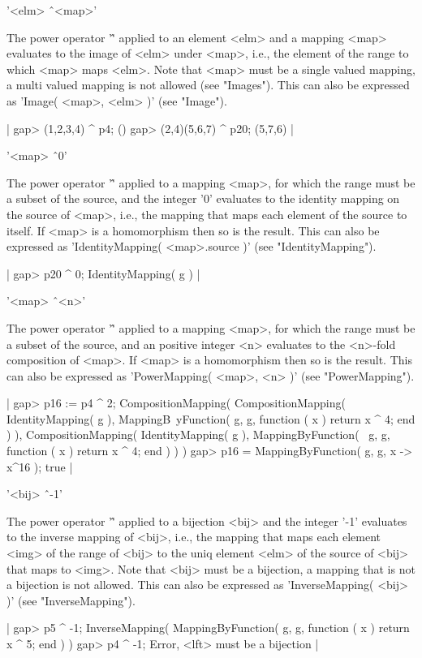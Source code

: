 '<elm> \^\ <map>'

The  power operator '\^' applied to an element <elm> and  a mapping <map>
evaluates to  the  image of <elm> under <map>,  i.e., the element  of the
range to which <map> maps <elm>.  Note that <map> must be a single valued
mapping, a multi valued mapping is not allowed (see "Images").  This  can
also be expressed as 'Image( <map>, <elm> )' (see "Image").

|    gap> (1,2,3,4) ^ p4;
    ()
    gap> (2,4)(5,6,7) ^ p20;
    (5,7,6) |

'<map> \^\ 0'

The power operator '\^' applied to a mapping <map>, for  which  the range
must  be  a  subset of  the source, and the integer '0' evaluates  to the
identity mapping on the source of <map>, i.e., the mapping that maps each
element of the  source to  itself.  If <map> is a homomorphism then so is
the result.  This can also be expressed as 'IdentityMapping( <map>.source
)' (see "IdentityMapping").

|    gap> p20 ^ 0;
    IdentityMapping( g ) |

'<map> \^\ <n>'

The power  operator '\^'  applied to a mapping <map>, for which the range
must be a subset of the source, and an positive integer <n>  evaluates to
the <n>-fold composition of <map>.  If <map> is a homomorphism then so is
the result.  This  can also be  expressed as 'PowerMapping( <map>, <n> )'
(see "PowerMapping").

|    gap> p16 := p4 ^ 2;
    CompositionMapping( CompositionMapping( IdentityMapping( g ), MappingB\
    yFunction( g, g, function ( x )
        return x ^ 4;
    end ) ), CompositionMapping( IdentityMapping( g ), MappingByFunction( \
    g, g, function ( x )
        return x ^ 4;
    end ) ) )
    gap> p16 = MappingByFunction( g, g, x -> x^16 );
    true |

'<bij> \^\ -1'

The power operator '\^' applied to a bijection <bij> and the integer '-1'
evaluates to the inverse mapping  of <bij>,  i.e., the mapping that  maps
each element <img> of the range of <bij> to the uniq element <elm> of the
source of <bij> that maps to <img>.  Note that <bij> must be a bijection,
a mapping  that  is not  a bijection is not allowed.   This can  also  be
expressed as 'InverseMapping( <bij> )' (see "InverseMapping").

|    gap> p5 ^ -1;
    InverseMapping( MappingByFunction( g, g, function ( x )
        return x ^ 5;
    end ) )
    gap> p4 ^ -1;
    Error, <lft> must be a bijection |

